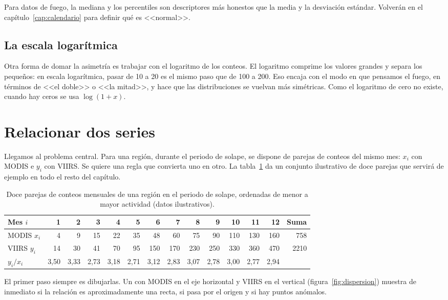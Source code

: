 Para datos de fuego, la mediana y los percentiles son descriptores más honestos que la media y
la desviación estándar. Volverán en el capítulo~\ref{cap:calendario} para definir qué es
<<normal>>.

\subsection{La escala logarítmica}

Otra forma de domar la asimetría es trabajar con el logaritmo de los conteos. El logaritmo
comprime los valores grandes y separa los pequeños: en escala logarítmica, pasar de 10 a 20 es
el mismo paso que de 100 a 200. Eso encaja con el modo en que pensamos el fuego, en términos de
<<el doble>> o <<la mitad>>, y hace que las distribuciones se vuelvan más simétricas. Como el
logaritmo de cero no existe, cuando hay ceros se usa $\log(1 + x)$.

\section{Relacionar dos series}

Llegamos al problema central. Para una región, durante el periodo de solape, se dispone de
parejas de conteos del mismo mes: $x_i$ con MODIS e $y_i$ con VIIRS. Se quiere una regla que
convierta uno en otro. La tabla~\ref{tab:pares} da un conjunto ilustrativo de doce parejas que
servirá de ejemplo en todo el resto del capítulo.

\begin{table}[ht]
\centering
\small
\begin{tabular}{l*{12}{r}r}
\toprule
Mes $i$ & 1 & 2 & 3 & 4 & 5 & 6 & 7 & 8 & 9 & 10 & 11 & 12 & Suma \\
\midrule
MODIS $x_i$ & 4 & 9 & 15 & 22 & 35 & 48 & 60 & 75 & 90 & 110 & 130 & 160 & 758 \\
VIIRS $y_i$ & 14 & 30 & 41 & 70 & 95 & 150 & 170 & 230 & 250 & 330 & 360 & 470 & 2210 \\
$y_i/x_i$ & 3,50 & 3,33 & 2,73 & 3,18 & 2,71 & 3,12 & 2,83 & 3,07 & 2,78 & 3,00 & 2,77 & 2,94 & \\
\bottomrule
\end{tabular}
\caption{Doce parejas de conteos mensuales de una región en el periodo de solape, ordenadas de
menor a mayor actividad (datos ilustrativos).}
\label{tab:pares}
\end{table}

El primer paso siempre es dibujarlas. Un  con MODIS en el eje
horizontal y VIIRS en el vertical (figura~\ref{fig:dispersion}) muestra de inmediato si la
relación es aproximadamente una recta, si pasa por el origen y si hay puntos anómalos.

